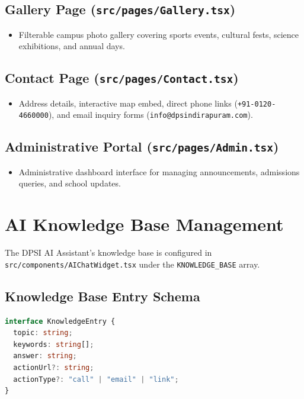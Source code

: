 \documentclass[11pt,a4paper]{article}
\begin{document}
\subsection{Gallery Page (\texttt{src/pages/Gallery.tsx})}
\begin{itemize}
    \item Filterable campus photo gallery covering sports events, cultural fests, science exhibitions, and annual days.
\end{itemize}

\subsection{Contact Page (\texttt{src/pages/Contact.tsx})}
\begin{itemize}
    \item Address details, interactive map embed, direct phone links (\texttt{+91-0120-4660000}), and email inquiry forms (\texttt{info@dpsindirapuram.com}).
\end{itemize}

\subsection{Administrative Portal (\texttt{src/pages/Admin.tsx})}
\begin{itemize}
    \item Administrative dashboard interface for managing announcements, admissions queries, and school updates.
\end{itemize}

\newpage

\section{AI Knowledge Base Management}

The DPSI AI Assistant's knowledge base is configured in \texttt{src/components/AIChatWidget.tsx} under the \texttt{KNOWLEDGE\_BASE} array.

\subsection{Knowledge Base Entry Schema}
\begin{lstlisting}[language=typescript]
interface KnowledgeEntry {
  topic: string;
  keywords: string[];
  answer: string;
  actionUrl?: string;
  actionType?: "call" | "email" | "link";
}
\end{lstlisting}
\end{document}
